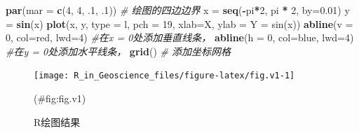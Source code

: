 \documentclass[]{scrbook}
\newenvironment{Shaded}{\begin{snugshade}}{\end{snugshade}}
\newcommand{\CommentTok}[1]{\textcolor[rgb]{0.56,0.35,0.01}{\textit{#1}}}
\newcommand{\DataTypeTok}[1]{\textcolor[rgb]{0.13,0.29,0.53}{#1}}
\newcommand{\DecValTok}[1]{\textcolor[rgb]{0.00,0.00,0.81}{#1}}
\newcommand{\FloatTok}[1]{\textcolor[rgb]{0.00,0.00,0.81}{#1}}
\newcommand{\KeywordTok}[1]{\textcolor[rgb]{0.13,0.29,0.53}{\textbf{#1}}}
\newcommand{\NormalTok}[1]{#1}
\newcommand{\OperatorTok}[1]{\textcolor[rgb]{0.81,0.36,0.00}{\textbf{#1}}}
\newcommand{\StringTok}[1]{\textcolor[rgb]{0.31,0.60,0.02}{#1}}
\begin{document}
\begin{Shaded}
\begin{Highlighting}[]
\KeywordTok{par}\NormalTok{(}\DataTypeTok{mar =} \KeywordTok{c}\NormalTok{(}\DecValTok{4}\NormalTok{, }\DecValTok{4}\NormalTok{, }\FloatTok{.1}\NormalTok{, }\FloatTok{.1}\NormalTok{))  }\CommentTok{\# 绘图的四边边界}
\NormalTok{x =}\StringTok{ }\KeywordTok{seq}\NormalTok{(}\OperatorTok{{-}}\NormalTok{pi}\OperatorTok{*}\DecValTok{2}\NormalTok{, pi }\OperatorTok{*}\StringTok{ }\DecValTok{2}\NormalTok{, }\DataTypeTok{by=}\FloatTok{0.01}\NormalTok{)}
\NormalTok{y =}\StringTok{ }\KeywordTok{sin}\NormalTok{(x)}
\KeywordTok{plot}\NormalTok{(x, y, }\DataTypeTok{type =} \StringTok{\textquotesingle{}l\textquotesingle{}}\NormalTok{, }\DataTypeTok{pch =} \DecValTok{19}\NormalTok{, }\DataTypeTok{xlab=}\StringTok{\textquotesingle{}X\textquotesingle{}}\NormalTok{, }\DataTypeTok{ylab =} \StringTok{\textquotesingle{}Y = sin(x)\textquotesingle{}}\NormalTok{)}
\KeywordTok{abline}\NormalTok{(}\DataTypeTok{v =} \DecValTok{0}\NormalTok{, }\DataTypeTok{col=}\StringTok{\textquotesingle{}red\textquotesingle{}}\NormalTok{, }\DataTypeTok{lwd=}\DecValTok{4}\NormalTok{) }\CommentTok{\#在x = 0处添加垂直线条，}
\KeywordTok{abline}\NormalTok{(}\DataTypeTok{h =} \DecValTok{0}\NormalTok{, }\DataTypeTok{col=}\StringTok{\textquotesingle{}blue\textquotesingle{}}\NormalTok{, }\DataTypeTok{lwd=}\DecValTok{4}\NormalTok{) }\CommentTok{\#在y = 0处添加水平线条，}
\KeywordTok{grid}\NormalTok{()  }\CommentTok{\# 添加坐标网格}
\end{Highlighting}
\end{Shaded}

\begin{figure}

{\centering \texttt{[image: R\_in\_Geoscience\_files/figure-latex/fig.v1-1]} 

}

\caption{R绘图结果}(\#fig:fig.v1)
\end{figure}
\end{document}
